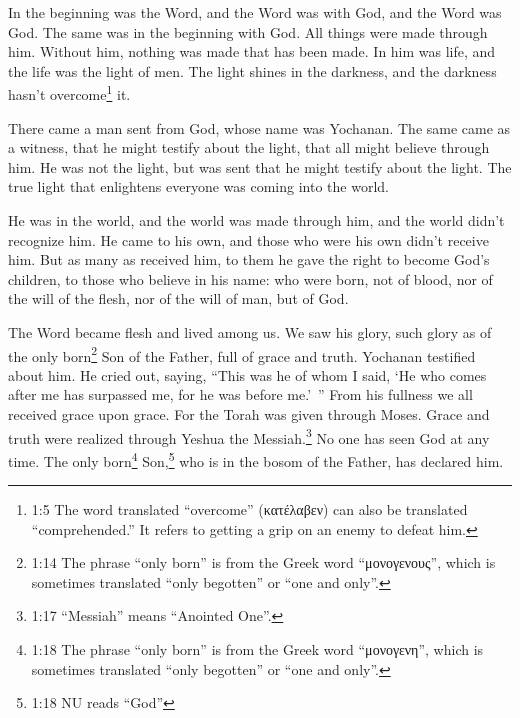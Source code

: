 \newpage
\null
\thispagestyle{empty}
\newpage
{}




\vspace{-1.36in}

\mychapter{} \myverse*{}In the beginning was the Word, and the Word was with God, and the
Word was God.
\myverse{}The same was in the beginning with God.
\myverse{}All things were made through him. Without him, nothing was made that has been
made.
\myverse{}In him was life, and the life was the light of men.
\myverse{}The light shines in the darkness, and the darkness hasn’t overcome\footnote{1:5 The word translated “overcome” (κατέλαβεν) can also be translated “comprehended.” It refers to
	getting a grip on an enemy to defeat him.
} it.

\myverse{}There came a man sent from God, whose name was Yochanan.
\myverse{}The same came as a witness, that he might testify about the light, that all
might believe through him.
\myverse{}He was not the light, but was sent that he might testify about the light.
\myverse{}The true light that enlightens everyone was coming into the world.

\myverse{}He was in the world, and the world was made through him, and
the world didn’t recognize him.
\myverse{}He came to his own, and those who were his own didn’t receive him.
\myverse{}But as many as received him, to them he gave the right to become God’s children,
to those who believe in his name:
\myverse{}who were born, not of blood, nor of the will of the flesh, nor of the will
of man, but of God.

\myverse{}The Word became flesh and lived among us. We saw his glory, such
glory as of the only born\footnote{1:14 The phrase “only born” is from the Greek word “μονογενους”, which is sometimes translated “only
	begotten” or “one and only”.} Son of the Father, full of grace and truth.
\myverse{}Yochanan testified about him. He cried out, saying, “This was he of whom I
said, ‘He who comes after me has surpassed me, for he was before me.’ ”
\myverse{}From his fullness we all received grace upon grace.
\myverse{}For the Torah was given through Moses. Grace and truth were realized through
Yeshua the Messiah.\footnote{1:17 “Messiah” means “Anointed One”.}
\myverse{}No one has seen God at any time. The only born\footnote{1:18 The phrase “only born” is from the Greek word “μονογενη”, which is sometimes translated “only
	begotten” or “one and only”.} Son,\footnote{1:18 NU reads “God”} who is in the bosom of the Father, has declared him.

